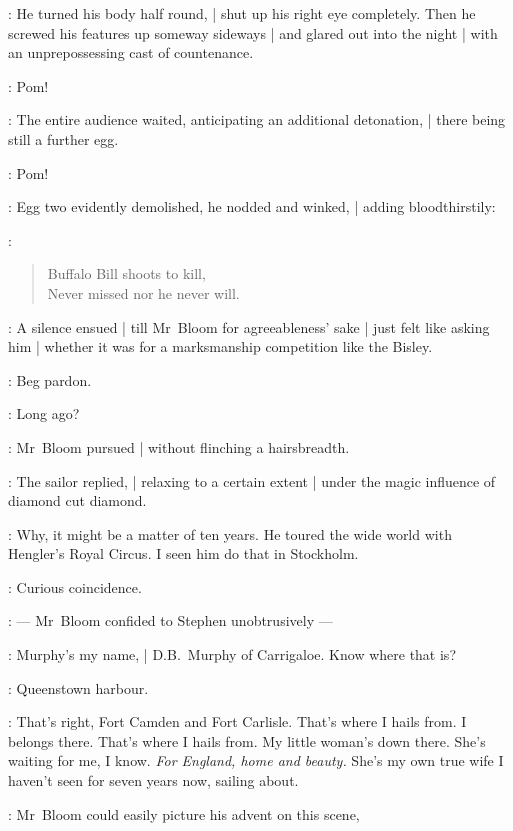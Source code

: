 :
He turned his body half round, |
shut up his right eye completely.
Then he screwed his features up someway sideways |
and glared out into the night |
with an unprepossessing cast of countenance.

\Murphy:
Pom!

:
The entire audience waited, anticipating an additional detonation, |
there being still a further egg.


\Murphy:
Pom!

:
Egg two evidently demolished, he nodded and winked, |
adding bloodthirstily:

\Murphy:
\begin{verse}
    Buffalo Bill shoots to kill,\\
    Never missed nor he never will.
\end{verse}

:
A silence ensued |
till Mr~Bloom for agreeableness' sake |
just felt like asking him |
whether it was for a marksmanship competition like the Bisley.

\Murphy:
Beg pardon.

\Bloom:
Long ago?

:
Mr~Bloom pursued |
without flinching a hairsbreadth.

:
The sailor replied, |
relaxing to a certain extent |
under the magic influence of diamond cut diamond.

\Murphy:
Why, it might be a matter of ten years.
He toured the wide world with Hengler's Royal Circus.
I seen him do that in Stockholm.

\Bloom:
Curious coincidence.

:
    --- Mr~Bloom confided to Stephen unobtrusively ---

\Murphy:
Murphy's my name, |
D.B.~Murphy of Carrigaloe.
Know where that is?

\Stephen:
Queenstown harbour.

\Murphy:
That's right,
Fort Camden and Fort Carlisle.
That's where I hails from.
I belongs there.
That's where I hails from.
My little woman's down there.
She's waiting for me, I know.
\emph{For England, home and beauty.}
She's my own true wife I haven't seen for seven years now, sailing about.

:
Mr~Bloom could easily picture his advent on this scene,

